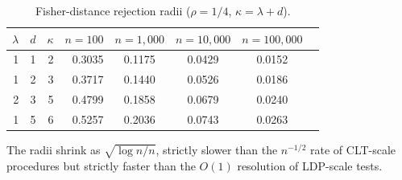 \documentclass[11pt]{article}
\newcommand{\rhotail}{\rho}  %
\newcommand{\1}{\mathbf{1}}
\theoremstyle{plain}
\theoremstyle{definition}
\theoremstyle{remark}
\begin{document}
\begin{table}[!ht]
\centering
\caption{Fisher-distance rejection radii ($\rhotail=1/4$, $\kappa=\lambda+d$).}\label{tab:fisher}
\smallskip
\begin{tabular}{rrrrcccc}
\toprule
$\lambda$ & $d$ & $\kappa$ & $n=100$ & $n=1{,}000$ & $n=10{,}000$ & $n=100{,}000$ \\
\midrule
1 & 1 & 2 & 0.3035 & 0.1175 & 0.0429 & 0.0152 \\
1 & 2 & 3 & 0.3717 & 0.1440 & 0.0526 & 0.0186 \\
2 & 3 & 5 & 0.4799 & 0.1858 & 0.0679 & 0.0240 \\
1 & 5 & 6 & 0.5257 & 0.2036 & 0.0743 & 0.0263 \\
\bottomrule
\end{tabular}
\end{table}

The radii shrink as $\sqrt{\log n/n}$, strictly slower than the $n^{-1/2}$ rate of CLT-scale procedures but strictly faster than the $O(1)$ resolution of LDP-scale tests.
\end{document}
